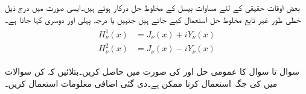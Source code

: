 بعض اوقات حقیقی  کے لئے مساوات بیسل کے مخلوط حل درکار ہوتے ہیں۔ایسی صورت میں درج ذیل خطی طور غیر تابع مخلوط حل  استعمال کیے جاتے ہیں جنہیں  یا درجہ  پہلی اور دوسری  کہا جاتا ہے۔
\begin{gather}
\begin{aligned}\label{مساوات_بیسل_ہینکل}
H_{\nu}^1(x)&=J_{\nu}(x)+iY_{\nu}(x)\\
H_{\nu}^2(x)&=J_{\nu}(x)-iY_{\nu}(x)
\end{aligned}
\end{gather}

سوال  تا سوال  کا عمومی حل  اور  کی صورت میں حاصل کریں۔بتلائیں کہ کن سوالات میں  کی جگہ  استعمال کرنا ممکن ہے۔دی گئی اضافی معلومات استعمال کریں۔

